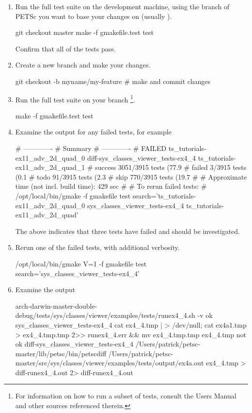 \begin{enumerate}
\item Run the full test suite on the development machine, using the branch of PETSc you want to base your changes on (usually ).
\begin{bashlisting}
git checkout master
make -f gmakefile.test test
\end{bashlisting}
Confirm that all of the tests pass.
\item Create a new branch and make your changes.
\begin{bashlisting}
git checkout -b myname/my-feature
# make and commit changes
\end{bashlisting}
\item Run the full test suite on your branch \footnote{For information on how to run a subset of tests, consult the Users Manual and other sources referenced therein.}.
\begin{bashlisting}
make -f gmakefile.test test
\end{bashlisting}
\item Examine the output for any failed tests, for example
\begin{outputlisting}
# -------------
#   Summary
# -------------
# FAILED ts_tutorials-ex11_adv_2d_quad_0 diff-sys_classes_viewer_tests-ex4_4 ts_tutorials-ex11_adv_2d_quad_1
# success 3051/3915 tests (77.9%
# failed 3/3915 tests (0.1%
# todo 91/3915 tests (2.3%
# skip 770/3915 tests (19.7%
#
# Approximate time (not incl. build time): 429 sec
#
# To rerun failed tests:
#     /opt/local/bin/gmake -f gmakefile test search='ts_tutorials-ex11_adv_2d_quad_0 sys_classes_viewer_tests-ex4_4 ts_tutorials-ex11_adv_2d_quad'
\end{outputlisting}
The above indicates that three tests have failed and should be investigated.
\item Rerun one of the failed tests, with additional verbosity.
\begin{bashlisting}
/opt/local/bin/gmake V=1 -f gmakefile test search='sys_classes_viewer_tests-ex4_4'
\end{bashlisting}
\item Examine the output
\begin{outputlisting}
arch-darwin-master-double-debug/tests/sys/classes/viewer/examples/tests/runex4_4.sh  -v
ok sys_classes_viewer_tests-ex4_4 cat ex4_4.tmp | > /dev/null; cat ex4a1.tmp > ex4_4.tmp.tmp 2>> runex4_4.err && mv ex4_4.tmp.tmp ex4_4.tmp
not ok diff-sys_classes_viewer_tests-ex4_4 /Users/patrick/petsc-master/lib/petsc/bin/petscdiff  /Users/patrick/petsc-master/src/sys/classes/viewer/examples/tests/output/ex4a.out ex4_4.tmp > diff-runex4_4.out 2> diff-runex4_4.out

\end{outputlisting}
\end{enumerate}
